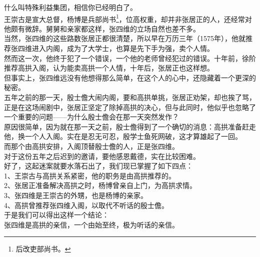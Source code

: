 \begin{multicols}{\theparacolNo}
什么叫特殊利益集团，相信你已经明白了。\\

王崇古是宣大总督，杨博是兵部尚书\footnote{后改吏部尚书。}，位高权重，却并非张居正的人，还经常对他颇有微辞。舅舅和亲家都这样，张四维的立场自然也差不多。\\

当然，张四维的这些路数张居正都很清楚，所以早在万历三年（1575年），他就推荐张四维进入内阁，成为了大学士，也算是先下手为强，卖个人情。\\

然而这一次，他终于犯了一个错误，一个他的老师曾经犯过的错误。十年前，徐阶推荐高拱入阁，认为能卖高拱一个人情，十年后，张居正也这样想。\\

但事实上，张四维远没有他想得那么简单，在这个人的心中，还隐藏着一个更深的秘密。\\

五年之前的那一天，殷士儋大闹内阁，要和高拱单挑，张居正劝架，却也挨了骂，正是在这场闹剧中，张居正坚定了除掉高拱的决心，但与此同时，他似乎也忽略了一个重要的问题——为什么殷士儋会在那一天突然发作？\\

原因很简单，因为就在那一天之前，殷士儋得到了一个确切的消息：高拱准备赶走他，换一个人入阁。实在是忍无可忍，殷学士鱼死网破，这才算雄起了一回。\\

而那个由高拱安排，入阁顶替殷士儋的人，正是张四维。\\

对于这份五年之后迟到的邀请，要他感恩戴德，实在比较困难。\\

好了，这起迷案就要水落石出了，我们现已掌握了如下四点：\\

1、王崇古与高拱关系紧密，他的职务是由高拱推荐的。\\

2、张居正准备解决高拱之时，杨博曾亲自上门，为高拱求情。\\

3、张四维是王崇古的外甥，也是杨博的亲家。\\

4、高拱曾推荐张四维入阁，以取代不听话的殷士儋。\\

于是我们可以得出这样一个结论：\\

张四维是高拱的亲信，一个由始至终，极为听话的亲信。\\


\end{multicols}
